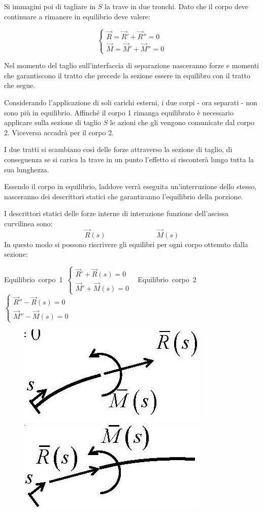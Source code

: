 \documentclass{article}
\begin{document}
\begin{adjustwidth}{2in}{}
	Si immagini poi di tagliare in $S$ la trave in due tronchi. Dato che il corpo deve continuare a rimanere in equilibrio deve valere:

	\[
	\begin{cases} \vec{R} = \vec{R}' + \vec{R}'' = 0 \\ \vec {M} = \vec{M}' + \vec{M}'' = 0\end{cases}
	\]
	
	Nel momento del taglio sull'interfaccia di separazione nasceranno forze e momenti che garantiscono il tratto che precede la sezione essere in equilibro con il tratto che segue.\newline 
	
	Considerando l'applicazione  di soli carichi esterni, i due corpi - ora separati - non sono più in equilibrio.
	Affinché il corpo 1 rimanga equilibrato è necessario applicare sulla sezione di taglio $ S $ le azioni che gli
	vengono comunicate dal corpo 2. Viceversa accadrà per il corpo 2. \newline

	I due tratti si scambiano così delle forze attraverso la sezione di taglio, di conseguenza se si carica la trave in
	un punto l’effetto si risconterà lungo tutta la sua lunghezza.
	
	Essendo il corpo in equilibrio, laddove verrà eseguita un'interruzione dello stesso, nasceranno dei descrittori statici che garantiranno l'equilibrio della porzione. 
	
	I descrittori statici delle forze interne di interazione funzione
	dell’ascissa curvilinea sono:
	\[
	\vec{R}(s) \hspace{3cm} \vec{M}(s)
	\]
\newpage	
	In questo modo si possono riscrivere gli equilibri per ogni corpo ottenuto dalla sezione: \newline
	
	\mbox{Equilibrio corpo 1
	$
	\begin{cases}
	\vec{R}'+ \vec{R}(s) =0 \\
		\vec{M}'+ \vec{M}(s) =0
		\end{cases}
	$
} \hspace{1cm} \mbox{Equilibrio corpo 2
	$
	\begin{cases}
		\vec{R}'' - \vec{R}(s) =0 \\
		\vec{M}''- \vec{M}(s) =0 
	\end{cases}
	$
} 

	\begin{figure}[H]
		\centering
		\includegraphics[width=0.15\linewidth]{"immagini/1.PARTE5_Pagina_03 (2)"}
		\includegraphics[width=0.15\linewidth]{"immagini/1.PARTE5_Pagina_03"}
	\end{figure}


\end{adjustwidth}
\end{document}
